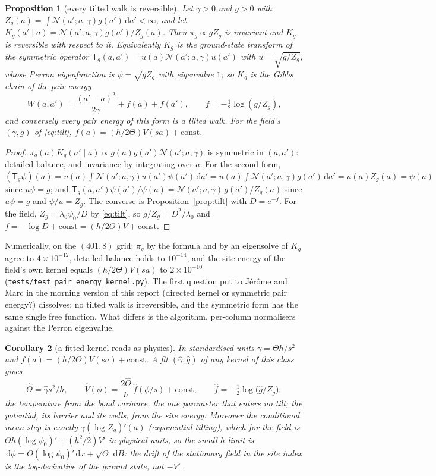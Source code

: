 \documentclass[10pt,a4paper]{article}
\newcommand{\Th}{\Theta}
\newcommand{\code}[1]{\texttt{\small #1}}
\newcommand{\dd}{\,\mathrm{d}}
\newcommand{\Nn}{\mathcal{N}}
\theoremstyle{plain}
\newtheorem{proposition}{Proposition}
\newtheorem{corollary}[proposition]{Corollary}
\theoremstyle{remark}
\begin{document}
\begin{proposition}[every tilted walk is reversible]\label{prop:rev}
Let $\gamma>0$ and $g>0$ with $Z_g(a)=\int\Nn(a';a,\gamma)g(a')\dd a'<\infty$, and let
$K_g(a'\mid a)=\Nn(a';a,\gamma)g(a')/Z_g(a)$. Then $\pi_g\propto gZ_g$ is invariant and $K_g$ is reversible
with respect to it. Equivalently $K_g$ is the ground-state transform of the symmetric operator
$\mathsf T_g(a,a')=u(a)\Nn(a';a,\gamma)u(a')$ with $u=\sqrt{g/Z_g}$, whose Perron eigenfunction is
$\psi=\sqrt{gZ_g}$ with eigenvalue $1$; so $K_g$ is the Gibbs chain of the pair energy
\begin{equation}
  W(a,a')=\frac{(a'-a)^2}{2\gamma}+f(a)+f(a'),\qquad f=-\tfrac12\log(g/Z_g),
  \label{eq:W}
\end{equation}
and conversely every pair energy of this form is a tilted walk. For the field's $(\gamma,g)$ of
\eqref{eq:tilt}, $f(a)=(h/2\Th)V(sa)+\mathrm{const}$.
\end{proposition}
\begin{proof}
$\pi_g(a)K_g(a'\mid a)\propto g(a)g(a')\Nn(a';a,\gamma)$ is symmetric in $(a,a')$: detailed balance, and
invariance by integrating over $a$. For the second form, $(\mathsf T_g\psi)(a)=u(a)\int\Nn(a';a,\gamma)
u(a')\psi(a')\dd a'=u(a)\int\Nn(a';a,\gamma)g(a')\dd a'=u(a)Z_g(a)=\psi(a)$ since $u\psi=g$; and
$\mathsf T_g(a,a')\psi(a')/\psi(a)=\Nn(a';a,\gamma)\,g(a')/Z_g(a)$ since $u\psi=g$ and $\psi/u=Z_g$. The converse is
Proposition~\ref{prop:tilt} with $D=e^{-f}$. For the field, $Z_g=\lambda_0\psi_0/D$ by \eqref{eq:tilt}, so
$g/Z_g=D^2/\lambda_0$ and $f=-\log D+\mathrm{const}=(h/2\Th)V+\mathrm{const}$.
\end{proof}
Numerically, on the $(401,8)$ grid: $\pi_g$ by the formula and by an eigensolve of $K_g$ agree to
$4\times10^{-12}$, detailed balance holds to $10^{-14}$, and the site energy of the field's own kernel
equals $(h/2\Th)V(sa)$ to $2\times10^{-10}$ (\code{tests/test\_pair\_energy\_kernel.py}). The first
question put to Jérôme and Marc in the morning version of this report (directed kernel or symmetric
pair energy?) dissolves: no tilted walk is irreversible, and the symmetric form has the same single
free function. What differs is the algorithm, per-column normalisers against the Perron eigenvalue.

\begin{corollary}[a fitted kernel reads as physics]\label{cor:read}
In standardised units $\gamma=\Th h/s^2$ and $f(a)=(h/2\Th)V(sa)+\mathrm{const}$. A fit $(\hat\gamma,\hat g)$
of any kernel of this class gives
\[
  \hat\Th=\hat\gamma s^2/h,\qquad \hat V(\phi)=\frac{2\hat\Th}{h}\,\hat f(\phi/s)+\mathrm{const},\qquad
  \hat f=-\tfrac12\log\big(\hat g/Z_{\hat g}\big):
\]
the temperature from the bond variance, the one parameter that enters no tilt; the potential, its
barrier and its wells, from the site energy. Moreover the conditional mean step is exactly
$\gamma(\log Z_g)'(a)$ (exponential tilting), which for the field is $\Th h(\log\psi_0)'+(h^2/2)V'$ in
physical units, so the small-$h$ limit is $\dd\phi=\Th(\log\psi_0)'\dd x+\sqrt{\Th}\,\dd B$: the drift of
the stationary field in the site index is the log-derivative of the ground state, not $-V'$.
\end{corollary}
\end{document}
